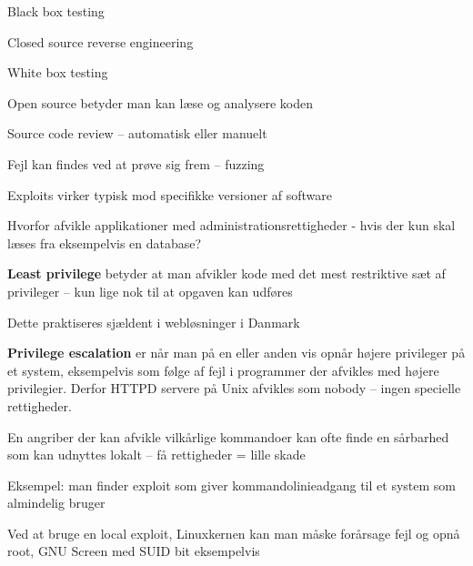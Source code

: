 \documentclass[Screen16to9,17pt]{foils}
\begin{document}

\begin{list1}
\item Black box testing
\item Closed source reverse engineering
\item White box testing
\item Open source betyder man kan læse og analysere koden
\item Source code review -- automatisk eller manuelt
\item Fejl kan findes ved at prøve sig frem -- fuzzing
\item Exploits virker typisk mod specifikke versioner af software
\end{list1}



\begin{list1}
\item Hvorfor afvikle applikationer med administrationsrettigheder -
  hvis der kun skal læses fra eksempelvis en database?
\item {\bfseries Least privilege}
betyder at man afvikler kode med det mest
restriktive sæt af privileger -- kun lige nok til at
opgaven kan udføres
\item Dette praktiseres sjældent i webløsninger i Danmark
\end{list1}

\begin{list1}
\item {\bfseries Privilege escalation} er når man på en eller anden vis
opnår højere privileger på et system, eksempelvis som
følge af fejl i programmer der afvikles med højere
privilegier. Derfor HTTPD servere på Unix afvikles som
nobody -- ingen specielle rettigheder.
\item En angriber der kan afvikle vilkårlige kommandoer kan ofte finde
  en sårbarhed som kan udnyttes lokalt -- få rettigheder = lille skade
\end{list1}

Eksempel: man finder exploit som giver kommandolinieadgang til et system
som almindelig bruger

Ved at bruge en local exploit, Linuxkernen kan man måske forårsage fejl
og opnå root, GNU Screen med SUID bit eksempelvis


\end{document}
